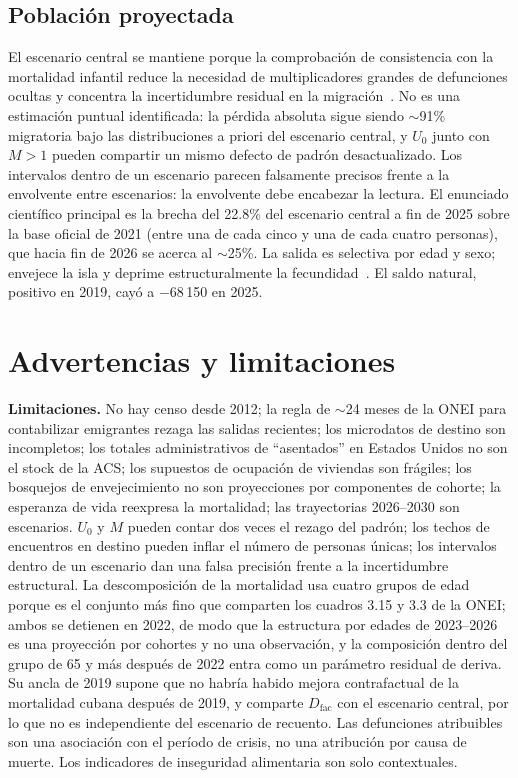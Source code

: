 \documentclass[11pt,a4paper]{article}
\begin{document}
\subsection{Población proyectada}

El escenario central se mantiene porque la comprobación de consistencia con la mortalidad infantil reduce la necesidad de multiplicadores grandes de defunciones ocultas y concentra la incertidumbre residual en la migración~\citep{pagegarcia2020,modeld}.
No es una estimación puntual identificada: la pérdida absoluta sigue siendo $\sim$91\% migratoria bajo las distribuciones a priori del escenario central, y $U_0$ junto con $M>1$ pueden compartir un mismo defecto de padrón desactualizado.
Los intervalos dentro de un escenario parecen falsamente precisos frente a la envolvente entre escenarios: la envolvente debe encabezar la lectura.
El enunciado científico principal es la brecha del 22.8\% del escenario central a fin de 2025 sobre la base oficial de 2021 (entre una de cada cinco y una de cada cuatro personas), que hacia fin de 2026 se acerca al $\sim$25\%.
La salida es selectiva por edad y sexo; envejece la isla y deprime estructuralmente la fecundidad~\citep{coleman2006,diazbriquets2014,lee2014}.
El saldo natural, positivo en 2019, cayó a $-$68\,150 en 2025.

\section{Advertencias y limitaciones}

\textbf{Limitaciones.}
No hay censo desde 2012; la regla de $\sim$24 meses de la ONEI para contabilizar emigrantes rezaga las salidas recientes; los microdatos de destino son incompletos; los totales administrativos de ``asentados'' en Estados Unidos no son el stock de la ACS; los supuestos de ocupación de viviendas son frágiles; los bosquejos de envejecimiento no son proyecciones por componentes de cohorte; la esperanza de vida reexpresa la mortalidad; las trayectorias 2026--2030 son escenarios.
$U_0$ y $M$ pueden contar dos veces el rezago del padrón; los techos de encuentros en destino pueden inflar el número de personas únicas; los intervalos dentro de un escenario dan una falsa precisión frente a la incertidumbre estructural.
La descomposición de la mortalidad usa cuatro grupos de edad porque es el conjunto más fino que comparten los cuadros 3.15 y 3.3 de la ONEI; ambos se detienen en 2022, de modo que la estructura por edades de 2023--2026 es una proyección por cohortes y no una observación, y la composición dentro del grupo de 65 y más después de 2022 entra como un parámetro residual de deriva.
Su ancla de 2019 supone que no habría habido mejora contrafactual de la mortalidad cubana después de 2019, y comparte $D_{\mathrm{fac}}$ con el escenario central, por lo que no es independiente del escenario de recuento.
Las defunciones atribuibles son una asociación con el período de crisis, no una atribución por causa de muerte.
Los indicadores de inseguridad alimentaria son solo contextuales.
\end{document}

